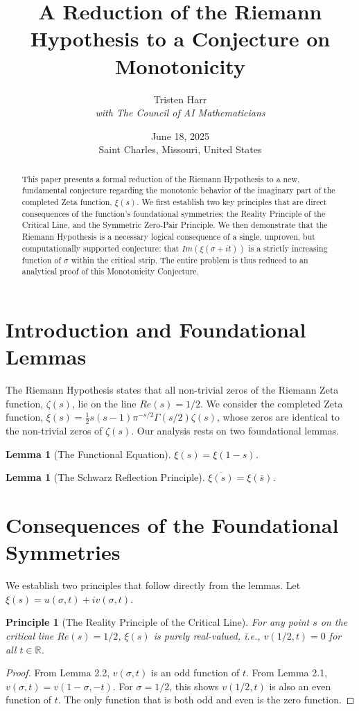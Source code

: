 \documentclass{article}
\title{\textbf{A Reduction of the Riemann Hypothesis to a Conjecture on Monotonicity}}
\author{Tristen Harr \\ \textit{with The Council of AI Mathematicians}}
\date{June 18, 2025 \\ Saint Charles, Missouri, United States}
\newtheorem{lemma}[theorem]{Lemma}
\newtheorem{principle}[theorem]{Principle}
\begin{document}
\maketitle

\begin{abstract}
    This paper presents a formal reduction of the Riemann Hypothesis to a new, fundamental conjecture regarding the monotonic behavior of the imaginary part of the completed Zeta function, $\xi(s)$. We first establish two key principles that are direct consequences of the function's foundational symmetries: the Reality Principle of the Critical Line, and the Symmetric Zero-Pair Principle. We then demonstrate that the Riemann Hypothesis is a necessary logical consequence of a single, unproven, but computationally supported conjecture: that $Im(\xi(\sigma+it))$ is a strictly increasing function of $\sigma$ within the critical strip. The entire problem is thus reduced to an analytical proof of this Monotonicity Conjecture.
\end{abstract}

\section{Introduction and Foundational Lemmas}
The Riemann Hypothesis states that all non-trivial zeros of the Riemann Zeta function, $\zeta(s)$, lie on the line $Re(s)=1/2$. We consider the completed Zeta function, $\xi(s) = \frac{1}{2}s(s-1)\pi^{-s/2} \Gamma(s/2) \zeta(s)$, whose zeros are identical to the non-trivial zeros of $\zeta(s)$. Our analysis rests on two foundational lemmas.

\begin{lemma}[The Functional Equation]
$\xi(s) = \xi(1-s)$.
\end{lemma}

\begin{lemma}[The Schwarz Reflection Principle]
$\overline{\xi(s)} = \xi(\bar{s})$.
\end{lemma}

\section{Consequences of the Foundational Symmetries}
We establish two principles that follow directly from the lemmas. Let $\xi(s) = u(\sigma, t) + i v(\sigma, t)$.

\begin{principle}[The Reality Principle of the Critical Line]
For any point $s$ on the critical line $Re(s)=1/2$, $\xi(s)$ is purely real-valued, i.e., $v(1/2, t) = 0$ for all $t \in \mathbb{R}$.
\end{principle}
\begin{proof}
From Lemma 2.2, $v(\sigma, t)$ is an odd function of $t$. From Lemma 2.1, $v(\sigma, t) = v(1-\sigma, -t)$. For $\sigma=1/2$, this shows $v(1/2, t)$ is also an even function of $t$. The only function that is both odd and even is the zero function.
\end{proof}
\end{document}
